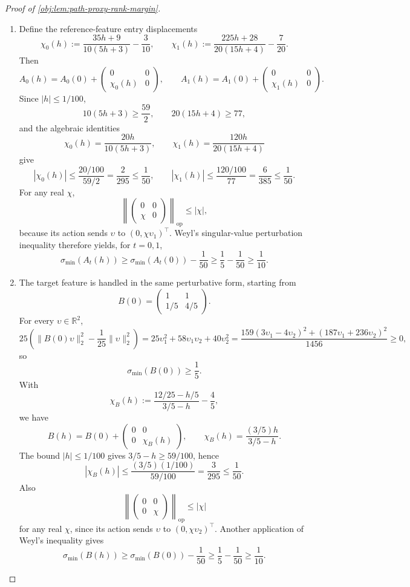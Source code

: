 \begin{proof}[Proof of \cref{obj:lem:path-proxy-rank-margin}]
\begin{enumerate}
\item Define the reference-feature entry displacements
\[
\chi_0(h):=\frac{35h+9}{10(5h+3)}-\frac3{10},
\qquad
\chi_1(h):=\frac{225h+28}{20(15h+4)}-\frac7{20}.
\]
Then
\[
A_0(h)=A_0(0)+\begin{pmatrix}0&0\\ \chi_0(h)&0\end{pmatrix},
\qquad
A_1(h)=A_1(0)+\begin{pmatrix}0&0\\ \chi_1(h)&0\end{pmatrix}.
\]
Since \(|h|\le1/100\),
\[
10(5h+3)\ge \frac{59}{2},
\qquad
20(15h+4)\ge 77,
\]
and the algebraic identities
\[
\chi_0(h)=\frac{20h}{10(5h+3)},
\qquad
\chi_1(h)=\frac{120h}{20(15h+4)}
\]
give
\[
|\chi_0(h)|\le \frac{20/100}{59/2}=\frac{2}{295}\le\frac1{50},
\qquad
|\chi_1(h)|\le \frac{120/100}{77}=\frac{6}{385}\le\frac1{50}.
\]
For any real \(\chi\),
\[
\left\|
\begin{pmatrix}0&0\\ \chi&0\end{pmatrix}
\right\|_{\mathrm{op}}\le |\chi|,
\]
because its action sends \(\upsilon\) to \((0,\chi\upsilon_1)^\top\). Weyl's singular-value perturbation inequality therefore yields, for \(t=0,1\),
\[
\sigma_{\min}(A_t(h))
\ge
\sigma_{\min}(A_t(0))-\frac1{50}
\ge
\frac15-\frac1{50}
\ge
\frac1{10}.
\] %

\item The target feature is handled in the same perturbative form, starting from
\[
B(0)=
\begin{pmatrix}1&1\\[0.2em]1/5&4/5\end{pmatrix}.
\]
For every \(\upsilon\in\mathbb R^2\),
\[
25\left(\|B(0)\upsilon\|_2^2-\frac1{25}\|\upsilon\|_2^2\right)
=
25\upsilon_1^2+58\upsilon_1\upsilon_2+40\upsilon_2^2
=
\frac{159(3\upsilon_1-4\upsilon_2)^2+(187\upsilon_1+236\upsilon_2)^2}{1456}\ge0,
\]
so
\[
\sigma_{\min}(B(0))\ge\frac15.
\]
With
\[
\chi_B(h):=\frac{12/25-h/5}{3/5-h}-\frac45,
\]
we have
\[
B(h)=B(0)+\begin{pmatrix}0&0\\0&\chi_B(h)\end{pmatrix},
\qquad
\chi_B(h)=\frac{(3/5)h}{3/5-h}.
\]
The bound \(|h|\le1/100\) gives \(3/5-h\ge59/100\), hence
\[
|\chi_B(h)|
\le
\frac{(3/5)(1/100)}{59/100}
=
\frac{3}{295}
\le
\frac1{50}.
\]
Also
\[
\left\|
\begin{pmatrix}0&0\\0&\chi\end{pmatrix}
\right\|_{\mathrm{op}}\le|\chi|
\]
for any real \(\chi\), since its action sends \(\upsilon\) to \((0,\chi\upsilon_2)^\top\). Another application of Weyl's inequality gives
\[
\sigma_{\min}(B(h))
\ge
\sigma_{\min}(B(0))-\frac1{50}
\ge
\frac15-\frac1{50}
\ge
\frac1{10}.
\] %


\end{enumerate}
\end{proof}

